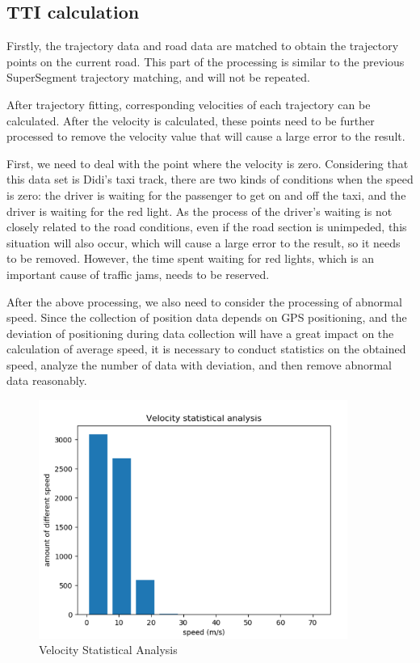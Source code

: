 \documentclass[fontset=none]{ctexart}
\theoremstyle{definition}
\theoremstyle{remark}
\begin{document}
\subsection{TTI calculation}
Firstly, the trajectory data and road data are matched to obtain the trajectory points on the current road. This part of the processing is similar to the previous SuperSegment trajectory matching, and will not be repeated.

After trajectory fitting, corresponding velocities of each trajectory can be calculated. After the velocity is calculated, these points need to be further processed to remove the velocity value that will cause a large error to the result.

First, we need to deal with the point where the velocity is zero. Considering that this data set is Didi's taxi track, there are two kinds of conditions when the speed is zero: the driver is waiting for the passenger to get on and off the taxi, and the driver is waiting for the red light. As the process of the driver's waiting is not closely related to the road conditions, even if the road section is unimpeded, this situation will also occur, which will cause a large error to the result, so it needs to be removed. However, the time spent waiting for red lights, which is an important cause of traffic jams, needs to be reserved.

After the above processing, we also need to consider the processing of abnormal speed. Since the collection of position data depends on GPS positioning, and the deviation of positioning during data collection will have a great impact on the calculation of average speed, it is necessary to conduct statistics on the obtained speed, analyze the number of data with deviation, and then remove abnormal data reasonably.

\begin{figure}[htb]
  \centering
  \includegraphics[width=0.9\textwidth]{images/velocity_statistical_analysis.png}
  \caption{Velocity Statistical Analysis}
  \label{fig: vsa}
\end{figure}
\end{document}
